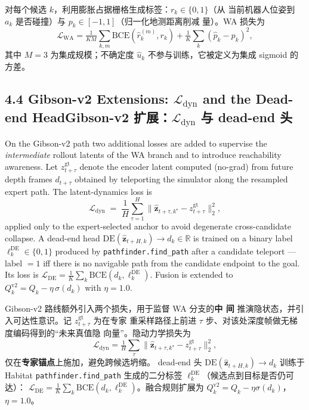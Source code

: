 \documentclass[11pt,a4paper]{article}
\newcommand{\en}[1]{\par\noindent #1\par\vspace{0.15em}}
\newcommand{\zh}[1]{\par\noindent\color{zhcol}\hspace{0.5em}#1\par\color{black}\vspace{0.6em}}
\newcommand{\bisubsec}[2]{\subsection[#1]{#1\quad\normalfont\small\color{zhcol}\textsf{#2}}}
\newcommand{\R}{\mathbb{R}}
\newcommand{\bz}{\mathbf{z}}
\begin{document}
\zh{\textsf{对每个候选 $k$，利用膨胀占据栅格生成标签：$r_k\in\{0,1\}$（从
当前机器人位姿到 $a_k$ 是否碰撞）与 $p_k\in[-1,1]$（归一化地测距离削减
量）。WA 损失为
\[
 \mathcal{L}_{\mathrm{WA}}
 = \tfrac{1}{KM}\sum_{k,m}\mathrm{BCE}(\hat r_k^{(m)}, r_k)
 + \tfrac{1}{K}\sum_k(\hat p_k - p_k)^2,
\]
其中 $M=3$ 为集成规模；不确定度 $\hat u_k$ 不参与训练，它被定义为集成
sigmoid 的方差。}}

\bisubsec{4.4 Gibson-v2 Extensions: $\mathcal{L}_{\mathrm{dyn}}$ and the Dead-end Head}{Gibson-v2 扩展：$\mathcal{L}_{\mathrm{dyn}}$ 与 dead-end 头}

\en{On the Gibson-v2 path two additional losses are added to supervise the
\emph{intermediate} rollout latents of the WA branch and to introduce
reachability awareness. Let $z^{\mathrm{gt}}_{t+\tau}$ denote the encoder
latent computed (no-grad) from future depth frames $d_{t+\tau}$ obtained
by teleporting the simulator along the resampled expert path. The
latent-dynamics loss is
\begin{equation}
  \mathcal{L}_{\mathrm{dyn}} \;=\;
  \frac{1}{H}\sum_{\tau=1}^{H}
  \bigl\| \hat{\bz}_{t+\tau,k^{\star}} - z^{\mathrm{gt}}_{t+\tau} \bigr\|_2^2,
\end{equation}
applied only to the expert-selected anchor to avoid degenerate
cross-candidate collapse. A dead-end head
$\mathrm{DE}(\hat{\bz}_{t+H,k}) \to d_k \in \R$ is trained on a binary
label $\ell^{\mathrm{DE}}_k \in \{0,1\}$ produced by
\texttt{pathfinder.find\_path} after a candidate teleport — label $=1$
iff there is no navigable path from the candidate endpoint to the goal.
Its loss is
$\mathcal{L}_{\mathrm{DE}} = \tfrac{1}{K}\sum_k \mathrm{BCE}(d_k, \ell^{\mathrm{DE}}_k)$.
Fusion is extended to
\(
  Q_k^{\mathrm{v2}} = Q_k - \eta\,\sigma(d_k)
\)
with $\eta = 1.0$.}

\zh{\textsf{Gibson-v2 路线额外引入两个损失，用于监督 WA 分支的\textbf{中
间 }推演隐状态，并引入可达性意识。记 $z^{\mathrm{gt}}_{t+\tau}$ 为在专家
重采样路径上前进 $\tau$ 步、对该处深度帧做无梯度编码得到的“未来真值隐
向量”。隐动力学损失为
\[
 \mathcal{L}_{\mathrm{dyn}}
 = \tfrac{1}{H}\sum_\tau \|\hat{\bz}_{t+\tau,k^{\star}} - z^{\mathrm{gt}}_{t+\tau}\|_2^2,
\]
仅在\textbf{专家锚点}上施加，避免跨候选坍缩。
dead-end 头 $\mathrm{DE}(\hat{\bz}_{t+H,k}) \to d_k$ 训练于 Habitat
\texttt{pathfinder.find\_path} 生成的二分标签
$\ell^{\mathrm{DE}}_k$（候选点到目标是否仍可达）：
$\mathcal{L}_{\mathrm{DE}} = \tfrac{1}{K}\sum_k \mathrm{BCE}(d_k, \ell^{\mathrm{DE}}_k)$。融合规则扩展为
$Q_k^{\mathrm{v2}} = Q_k - \eta\sigma(d_k)$，$\eta=1.0$。}}
\end{document}
